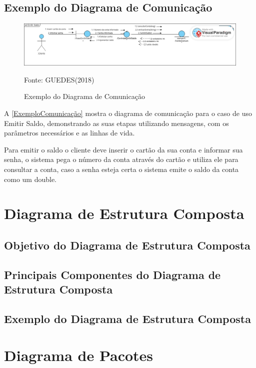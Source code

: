 \documentclass[12pt,openright,oneside,a4paper,
	chapter=TITLE,
	section=TITLE,
	english,brazil]{abntex2}
\begin{document}
\section{Exemplo do Diagrama de Comunicação}

\begin{figure}[!htp]
	\caption{Exemplo do Diagrama de Comunicação}
	\centering
	\includegraphics[scale=0.3]{img/Exemplo Diagrama de Comunicação.png}
	\\

	\label{ExemploComunicação}
	\footnotesize\raggedright Fonte: GUEDES(2018)
\end{figure}

A \autoref{ExemploComunicação} mostra o diagrama de comunicação para o caso de uso Emitir Saldo, demonstrando as suas etapas utilizando mensagens, com os parâmetros necessários e as linhas de vida.

Para emitir o saldo o cliente deve inserir o cartão da sua conta e informar sua senha, o sistema pega o número da conta através do cartão e utiliza ele para consultar a conta, caso a senha esteja certa o sistema emite o saldo da conta como um double.

\chapter{Diagrama de Estrutura Composta}

\section{Objetivo do Diagrama de Estrutura Composta}

\section{Principais Componentes do Diagrama de Estrutura Composta}

\section{Exemplo do Diagrama de Estrutura Composta}

\chapter{Diagrama de Pacotes}
\end{document}
